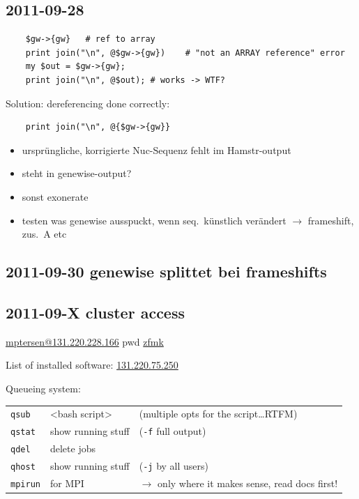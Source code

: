 \subsection*{2011-09-28}

\begin{lstlisting}
	$gw->{gw}	# ref to array
	print join("\n", @$gw->{gw})	# "not an ARRAY reference" error
	my $out = $gw->{gw};
	print join("\n", @$out); # works -> WTF?
\end{lstlisting}

Solution: dereferencing done correctly: 
\begin{lstlisting}
	print join("\n", @{$gw->{gw}}
\end{lstlisting}

\begin{itemize}
	\item ursprüngliche, korrigierte Nuc-Sequenz fehlt im Hamstr-output
	\item steht in genewise-output?
	\item sonst exonerate
	\item testen was genewise ausspuckt, wenn seq.\ künstlich verändert
	$\rightarrow$ frameshift, zus.\ A etc
\end{itemize}

\subsection*{2011-09-30 genewise splittet bei frameshifts}

\subsection*{2011-09-X cluster access}

\url{mptersen@131.220.228.166} pwd \url{zfmk}

List of installed software: \url{131.220.75.250}

Queueing system:

\begin{table}[h]
	\begin{tabular}{l l l}
	\verb|qsub| & <bash script> & (multiple opts for the script\dots RTFM)\\
	\verb|qstat| & show running stuff & (\verb|-f| full output)\\
	\verb|qdel| & delete jobs & ~ \\
	\verb|qhost| & show running stuff & (\verb|-j| by all users)\\
	\verb|mpirun| & for MPI & $\rightarrow$ only where it makes sense, read docs
	first!
	\end{tabular}
\end{table}


